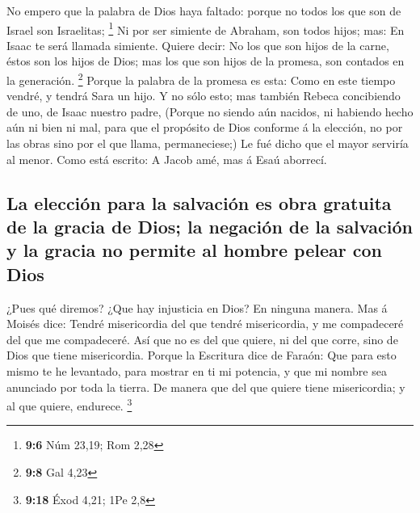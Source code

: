  No empero que la palabra de Dios haya faltado: porque no
todos los que son de Israel son Israelitas; \footnote{\textbf{9:6} Núm
  23,19; Rom 2,28}  Ni por ser simiente de Abraham, son
todos hijos; mas: En Isaac te será llamada simiente.  Quiere
decir: No los que son hijos de la carne, éstos son los hijos de Dios;
mas los que son hijos de la promesa, son contados en la generación.
\footnote{\textbf{9:8} Gal 4,23}  Porque la palabra de la
promesa es esta: Como en este tiempo vendré, y tendrá Sara un hijo.
 Y no sólo esto; mas también Rebeca concibiendo de uno, de
Isaac nuestro padre,  (Porque no siendo aún nacidos, ni
habiendo hecho aún ni bien ni mal, para que el propósito de Dios
conforme á la elección, no por las obras sino por el que llama,
permaneciese;)  Le fué dicho que el mayor serviría al
menor.  Como está escrito: A Jacob amé, mas á Esaú
aborrecí.

\hypertarget{la-elecciuxf3n-para-la-salvaciuxf3n-es-obra-gratuita-de-la-gracia-de-dios-la-negaciuxf3n-de-la-salvaciuxf3n-y-la-gracia-no-permite-al-hombre-pelear-con-dios}{%
\subsection{La elección para la salvación es obra gratuita de la gracia
de Dios; la negación de la salvación y la gracia no permite al hombre
pelear con
Dios}\label{la-elecciuxf3n-para-la-salvaciuxf3n-es-obra-gratuita-de-la-gracia-de-dios-la-negaciuxf3n-de-la-salvaciuxf3n-y-la-gracia-no-permite-al-hombre-pelear-con-dios}}

 ¿Pues qué diremos? ¿Que hay injusticia en Dios? En ninguna
manera.  Mas á Moisés dice: Tendré misericordia del que
tendré misericordia, y me compadeceré del que me compadeceré.
 Así que no es del que quiere, ni del que corre, sino de
Dios que tiene misericordia.  Porque la Escritura dice de
Faraón: Que para esto mismo te he levantado, para mostrar en ti mi
potencia, y que mi nombre sea anunciado por toda la tierra.
 De manera que del que quiere tiene misericordia; y al que
quiere, endurece. \footnote{\textbf{9:18} Éxod 4,21; 1Pe 2,8}

